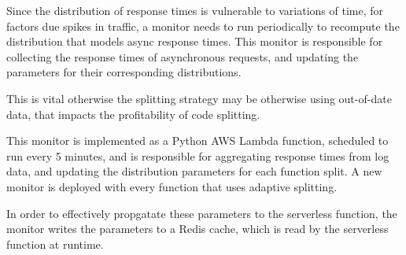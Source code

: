 Since the distribution of response times is vulnerable to variations of time, for factors due spikes in traffic, a monitor needs to run periodically to recompute the distribution that models async response times. This monitor is responsible for collecting the response times of asynchronous requests, and updating the parameters for their corresponding distributions.

This is vital otherwise the splitting strategy may be otherwise using out-of-date data, that impacts the profitability of code splitting.

This monitor is implemented as a Python AWS Lambda function, scheduled to run every 5 minutes, and is responsible for aggregating response times from log data, and updating the distribution parameters for each function split. A new monitor is deployed with every function that uses adaptive splitting.

In order to effectively propgatate these parameters to the serverless function, the monitor writes the parameters to a Redis cache, which is read by the serverless function at runtime.
